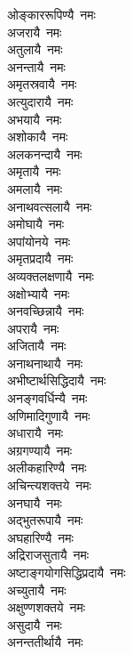 \begin{multicols}{\maxColumns}
\begin{flushleft}
ओङ्काररूपिण्यै~नमः\\
अजरायै~नमः\\
अतुलायै~नमः\\
अनन्तायै~नमः\\
अमृतस्रवायै~नमः\\
अत्युदारायै~नमः\\
अभयायै~नमः\\
अशोकायै~नमः\\
अलकनन्दायै~नमः\\
अमृतायै~नमः\hfill{}\\
अमलायै~नमः\\
अनाथवत्सलायै~नमः\\
अमोघायै~नमः\\
अपांयोनये~नमः\\
अमृतप्रदायै~नमः\\
अव्यक्तलक्षणायै~नमः\\
अक्षोभ्यायै~नमः\\
अनवच्छिन्नायै~नमः\\
अपरायै~नमः\\
अजितायै~नमः\hfill{}\\
अनाथनाथायै~नमः\\
अभीष्टार्थसिद्धिदायै~नमः\\
अनङ्गवर्धिन्यै~नमः\\
अणिमादिगुणायै~नमः\\
अधारायै~नमः\\
अग्रगण्यायै~नमः\\
अलीकहारिण्यै~नमः\\
अचिन्त्यशक्तये~नमः\\
अनघायै~नमः\\
अद्भुतरूपायै~नमः\hfill{}\\
अघहारिण्यै~नमः\\
अद्रिराजसुतायै~नमः\\
अष्टाङ्गयोगसिद्धिप्रदायै~नमः\\
अच्युतायै~नमः\\
अक्षुण्णशक्तये~नमः\\
असुदायै~नमः\\
अनन्ततीर्थायै~नमः\\

\end{flushleft}
\end{multicols}
